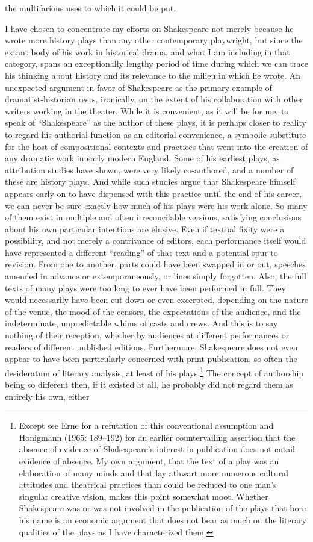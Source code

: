 the multifarious uses to which it could be put.

I have chosen to concentrate my efforts on Shakespeare not merely because he wrote more history plays than any other contemporary playwright, but since the extant body of his work in historical drama, and what I am including in that category, spans an exceptionally lengthy period of time during which we can trace his thinking about history and its relevance to the milieu in which he wrote. An unexpected argument in favor of Shakespeare as the primary example of dramatist-historian rests, ironically, on the extent of his collaboration with other writers working in the theater. While it is convenient, as it will be for me, to speak of ``Shakespeare'' as the author of these plays, it is perhaps closer to reality to regard his authorial function as an editorial convenience, a symbolic substitute for the host of compositional contexts and practices that went into the creation of any dramatic work in early modern England. Some of his earliest plays, as attribution studies have shown, were very likely co-authored, and a number of these are history plays. And while such studies argue that Shakespeare himself appears early on to have dispensed with this practice until the end of his career, we can never be sure exactly how much of his plays were his work alone. So many of them exist in multiple and often irreconcilable versions, satisfying conclusions about his own particular intentions are elusive. Even if textual fixity were a possibility, and not merely a contrivance of editors, each performance itself would have represented a different ``reading'' of that text and a potential spur to revision. From one to another, parts could have been swapped in or out, speeches amended in advance or extemporaneously, or lines simply forgotten. Also, the full texts of many plays were too long to ever have been performed in full. They would necessarily have been cut down or even excerpted, depending on the nature of the venue, the mood of the censors, the expectations of the audience, and the indeterminate, unpredictable whims of casts and crews. And this is to say nothing of their reception, whether by audiences at different performances or readers of different published editions. Furthermore, Shakespeare does not even appear to have been particularly concerned with print publication, so often the desideratum of literary analysis, at least of his plays.\footnote{Except see Erne for a refutation of this conventional assumption and Honigmann (1965: 189--192) for an earlier countervailing assertion that the absence of evidence of Shakespeare's interest in publication does not entail evidence of absence. My own argument, that the text of a play was an elaboration of many minds and that lay athwart more numerous cultural attitudes and theatrical practices than could be reduced to one man's singular creative vision, makes this point somewhat moot. Whether Shakespeare was or was not involved in the publication of the plays that bore his name is an economic argument that does not bear as much on the literary qualities of the plays as I have characterized them.} The concept of authorship being so different then, if it existed at all, he probably did not regard them as entirely his own, either 